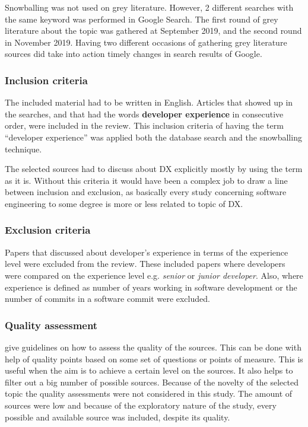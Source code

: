 \documentclass[english, 12pt, a4paper, sci, utf8, a-1b, online]{aaltothesis}
\begin{document}
Snowballing was not used on grey literature. However, 2 different searches with the same keyword was performed in Google Search. The first round of grey literature about the topic was gathered at September 2019, and the second round in November 2019. Having two different occasions of gathering grey literature sources did take into action timely changes in search results of Google.

\subsubsection{Inclusion criteria}

The included material had to be written in English. Articles that showed up in the searches, and that had the words \textbf{developer experience} in consecutive order, were included in the review. This inclusion criteria of having the term ``developer experience'' was applied both the database search and the snowballing technique.

The selected sources had to discuss about DX explicitly mostly by using the term as it is. Without this criteria it would have been a complex job to draw a line between inclusion and exclusion, as basically every study concerning software engineering to some degree is more or less related to topic of DX.

\subsubsection{Exclusion criteria}

Papers that discussed about developer's experience in terms of the experience level were excluded from the review. These included papers where developers were compared on the experience level e.g. \textit{senior} or \textit{junior developer}. Also, where experience is defined as number of years working in software development or the number of commits in a software commit were excluded.

\subsubsection{Quality assessment}

\textcite{guidelines-for-MLR} give guidelines on how to assess the quality of the sources. This can be done with help of quality points based on some set of questions or points of measure. This is useful when the aim is to achieve a certain level on the sources. It also helps to filter out a big number of possible sources. Because of the novelty of the selected topic the quality assessments were not considered in this study. The amount of sources were low and because of the exploratory nature of the study, every possible and available source was included, despite its quality.
\end{document}

